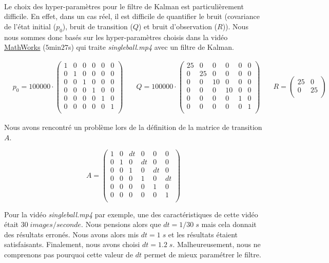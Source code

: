 \paragraph{}

	Le choix des hyper-paramètres pour le filtre de Kalman est particulièrement difficile. En effet, dans un cas réel, il est difficile de quantifier le bruit (covariance de l'état initial ($p_0$), bruit de transition ($Q$) et bruit d'observation ($R$)). Nous nous sommes donc basés sur les hyper-paramètres choisis dans la vidéo \href{https://fr.mathworks.com/videos/introduction-to-kalman-filters-for-object-tracking-79674.html}{MathWorks} ($5$min$27$s) qui traite \emph{singleball.mp4} avec un filtre de Kalman.

\begin{align*}
& p_0=100000 \cdot \begin{pmatrix}
	1 & 0 & 0 & 0 & 0 & 0 \\
	0 & 1 & 0 & 0 & 0 & 0 \\
	0 & 0 & 1 & 0 & 0 & 0 \\
	0 & 0 & 0 & 1 & 0 & 0 \\
	0 & 0 & 0 & 0 & 1 & 0 \\
	0 & 0 & 0 & 0 & 0 & 1 \\
\end{pmatrix} \quad
& Q=100000 \cdot \begin{pmatrix}
	25 & 0 & 0 & 0 & 0 & 0 \\
	0 & 25 & 0 & 0 & 0 & 0 \\
	0 & 0 & 10 & 0 & 0 & 0 \\
	0 & 0 & 0 & 10 & 0 & 0 \\
	0 & 0 & 0 & 0 & 1 & 0 \\
	0 & 0 & 0 & 0 & 0 & 1 \\
\end{pmatrix} \quad
& R=\begin{pmatrix}
	25 & 0 \\
	0 & 25 \\
\end{pmatrix}
\end{align*}

	Nous avons rencontré un problème lors de la définition de la matrice de transition $A$.
	
\[A=\begin{pmatrix}
	1 & 0 & dt & 0 & 0 & 0 \\
	0 & 1 & 0 & dt & 0 & 0 \\
	0 & 0 & 1 & 0 & dt & 0 \\
	0 & 0 & 0 & 1 & 0 & dt \\
	0 & 0 & 0 & 0 & 1 & 0 \\
	0 & 0 & 0 & 0 & 0 & 1 \\
\end{pmatrix}\]

	Pour la vidéo \emph{singleball.mp4} par exemple, une des caractéristiques de cette vidéo était $ 30 \; images/seconde $. Nous pensions alors que $ dt = 1/30 \; s $ mais cela donnait des résultats erronés. Nous avons alors mis $ dt = 1 \; s $ et les résultats étaient satisfaisants. Finalement, nous avons choisi $ dt = 1.2 \; s $. Malheureusement, nous ne comprenons pas pourquoi cette valeur de $ dt $ permet de mieux paramétrer le filtre.
